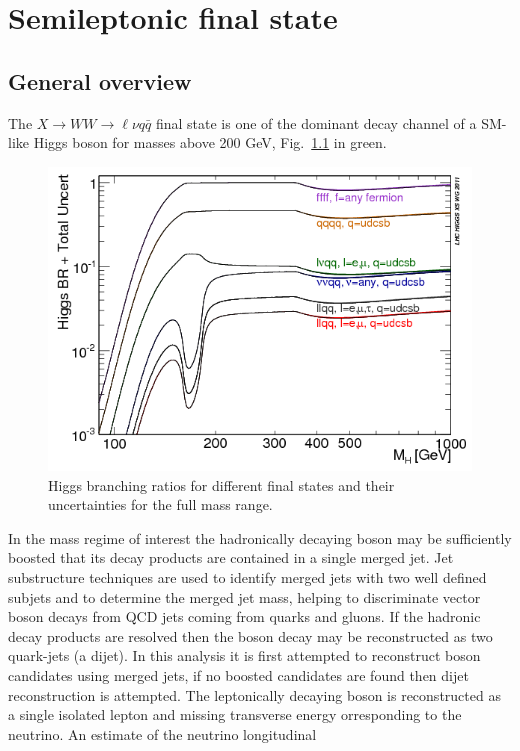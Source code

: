 \chapter{Semileptonic final state}

\section{General overview}
The $X \to WW \to \ell \nu q \bar{q}$ final state is one of the dominant decay channel of a SM-like Higgs boson for masses above 200 GeV,  Fig.~\ref{BRTotalUncertBands4f2} in green.
\begin{figure}
\centering
\includegraphics[scale= 0.65]{../Cap5/BRTotalUncertBands4f2}
\caption{Higgs branching ratios for different final states and their uncertainties for the full mass range.}
\label{BRTotalUncertBands4f2}
\end{figure}
In the mass regime of interest the hadronically decaying boson may be sufficiently boosted that
its decay products are contained in a single merged jet. Jet substructure techniques are used
to identify merged jets with two well defined subjets and to determine the merged jet mass,
helping to discriminate vector boson decays from QCD jets coming from quarks and gluons. If
the hadronic decay products are resolved then the boson decay may be reconstructed as two
quark-jets (a dijet). In this analysis it is first attempted to reconstruct boson candidates using
merged jets, if no boosted candidates are found then dijet reconstruction is attempted.
The leptonically decaying boson is reconstructed as a single isolated lepton and missing transverse energy
orresponding to the neutrino. An estimate of the neutrino longitudinal
